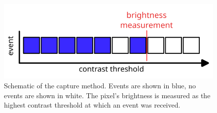 \begin{figure}
    \centering
    \includegraphics[width=.9\textwidth]{resources/plots/intensity-estimation/scanning.png}
    \caption{Schematic of the capture method. Events are shown in blue, no events are shown in white. The pixel's brightness is measured as the highest contrast threshold at which an event was received.}
    \label{fig:scanning}
\end{figure}